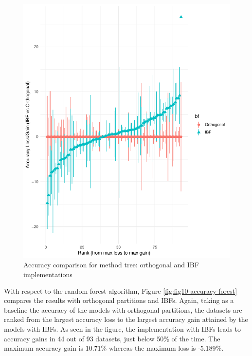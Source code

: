 \documentclass[]{elsarticle} %
\makeatletter
\def\maxwidth{\ifdim\Gin@nat@width>\linewidth\linewidth
\else\Gin@nat@width\fi}
\let\Oldincludegraphics\includegraphics
\renewcommand{\includegraphics}[1]{\Oldincludegraphics[width=\maxwidth]{#1}}
\makeatother
\begin{document}
\begin{figure}
\centering
\includegraphics{Trees_with_Base_Functions_v3_files/figure-latex/fig9-accuracy-tree-1.pdf}
\caption{\label{fig:fig9-accuracy-tree}Accuracy comparison for method
tree: orthogonal and IBF implementations}
\end{figure}

With respect to the random forest algorithm, Figure
\ref{fig:fig10-accuracy-forest} compares the results with orthogonal
partitions and IBFs. Again, taking as a baseline the accuracy of the
models with orthogonal partitions, the datasets are ranked from the
largest accuracy loss to the largest accuracy gain attained by the
models with IBFs. As seen in the figure, the implementation with IBFs
leads to accuracy gains in 44 out of 93 datasets, just below 50\% of the
time. The maximum accuracy gain is 10.71\% whereas the maximum loss is
-5.189\%.
\end{document}
